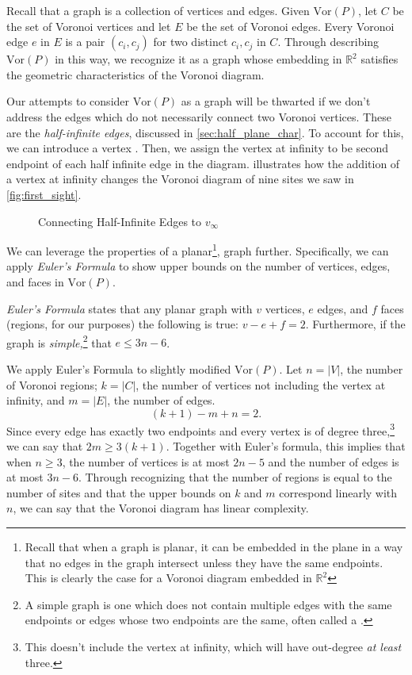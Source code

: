 \documentclass[12pt,twoside]{reedthesis}
\begin{document}
    Recall that a graph is a collection of vertices and edges. Given $\mbox{Vor}(P)$, let $C$ be the set of Voronoi vertices and let $E$ be the set of Voronoi edges. Every Voronoi edge $e$ in $E$ is a pair $(c_{i}, c_{j})$ for two distinct $c_{i}, c_{j}$  in $C$. Through describing $\mbox{Vor}(P)$ in this way, we recognize it as a graph whose embedding in $\mathds{R}^2$ satisfies the geometric characteristics of the Voronoi diagram.\par

    Our attempts to consider $\mbox{Vor}(P)$ as a graph will be thwarted if we don't address the edges which do not necessarily connect two Voronoi vertices. These are the \emph{half-infinite edges}, discussed in \cref{sec:half_plane_char}. To account for this, we can introduce a vertex . Then, we assign the vertex at infinity to be second endpoint of each half infinite edge in the diagram. illustrates how the addition of a vertex at infinity changes the Voronoi diagram of nine sites we saw in \cref{fig:first_sight}.\par

    \begin{figure}[!htb]
      \centering
      
      \caption{Connecting Half-Infinite Edges to $v_{\infty}$}
      \label{fig:vertex_at_infinity}
    \end{figure}

    We can leverage the properties of a planar\footnote{Recall that when a graph is planar, it can be embedded in the plane in a way that no edges in the graph intersect unless they have the same endpoints. This is clearly the case for a Voronoi diagram embedded in $\mathds{R}^2$}, graph further. Specifically, we can apply \emph{Euler's Formula} to show upper bounds on the number of vertices, edges, and faces in $\mbox{Vor}(P)$. 

    \emph{Euler's Formula} states that any planar graph with $v$ vertices, $e$ edges, and $f$ faces (regions, for our purposes) the following is true: $v - e + f = 2.$ Furthermore, if the graph is \emph{simple,}\footnote{A simple graph is one which does not contain multiple edges with the same endpoints or edges whose two endpoints are the same, often called a .} that $e \leq 3n -6$.\par

    We apply Euler's Formula to slightly modified $\mbox{Vor}(P)$. Let $n = |V|$, the number of Voronoi regions; $k = |C|$, the number of vertices not including the vertex at infinity, and $m = |E|$, the number of edges.
    $$(k + 1) - m + n = 2.$$ 
    Since every edge has exactly two endpoints and every vertex is of degree three,\footnote{This doesn't include the vertex at infinity, which will have out-degree \emph{at least} three.} we can say that $2m \geq 3(k + 1)$. Together with Euler's formula, this implies that when $n\geq 3$, the number of vertices is at most $2n-5$ and the number of edges is at most $3n-6$. Through recognizing that the number of regions is equal to the number of sites and that the upper bounds on $k$ and $m$ correspond linearly with $n$, we can say that the Voronoi diagram has linear complexity. 
\end{document}
